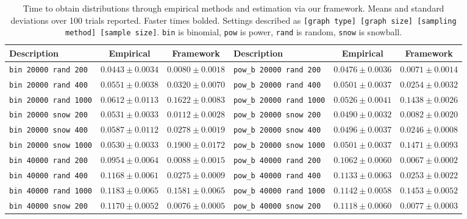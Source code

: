 \begin{table*}
\caption{Time to obtain distributions through empirical methods and estimation via our framework. Means and standard deviations over 100 trials reported. Faster times bolded. Settings described as \texttt{[graph type] [graph size] [sampling method] [sample size]}. \texttt{bin} is binomial, \texttt{pow} is power, \texttt{rand} is random, \texttt{snow} is snowball.}
\label{tab:timings}
\begin{tabular}{lcc|lcc}
\toprule
Description & Empirical & Framework & Description & Empirical & Framework \\
\midrule
\texttt{bin 20000 rand 200} & $0.0443 \pm 0.0034$ & $\mathbf{0.0080 \pm 0.0018}$ & \texttt{pow\_b 20000 rand 200} & $0.0476 \pm 0.0036$ & $\mathbf{0.0071 \pm 0.0014}$ \\
\texttt{bin 20000 rand 400} & $0.0551 \pm 0.0038$ & $\mathbf{0.0320 \pm 0.0070}$ & \texttt{pow\_b 20000 rand 400} & $0.0501 \pm 0.0037$ & $\mathbf{0.0254 \pm 0.0032}$ \\
\texttt{bin 20000 rand 1000} & $\mathbf{0.0612 \pm 0.0113}$ & $0.1622 \pm 0.0083$ & \texttt{pow\_b 20000 rand 1000} & $\mathbf{0.0526 \pm 0.0041}$ & $0.1438 \pm 0.0026$ \\
\texttt{bin 20000 snow 200} & $0.0531 \pm 0.0033$ & $\mathbf{0.0112 \pm 0.0028}$ & \texttt{pow\_b 20000 snow 200} & $0.0490 \pm 0.0032$ & $\mathbf{0.0082 \pm 0.0020}$ \\
\texttt{bin 20000 snow 400} & $0.0587 \pm 0.0112$ & $\mathbf{0.0278 \pm 0.0019}$ & \texttt{pow\_b 20000 snow 400} & $0.0496 \pm 0.0037$ & $\mathbf{0.0246 \pm 0.0008}$ \\
\texttt{bin 20000 snow 1000} & $\mathbf{0.0530 \pm 0.0033}$ & $0.1900 \pm 0.0172$ & \texttt{pow\_b 20000 snow 1000} & $\mathbf{0.0501 \pm 0.0037}$ & $0.1471 \pm 0.0093$ \\
\texttt{bin 40000 rand 200} & $0.0954 \pm 0.0064$ & $\mathbf{0.0088 \pm 0.0015}$ & \texttt{pow\_b 40000 rand 200} & $0.1062 \pm 0.0060$ & $\mathbf{0.0067 \pm 0.0002}$ \\
\texttt{bin 40000 rand 400} & $0.1168 \pm 0.0061$ & $\mathbf{0.0275 \pm 0.0009}$ & \texttt{pow\_b 40000 rand 400} & $0.1133 \pm 0.0063$ & $\mathbf{0.0253 \pm 0.0022}$ \\
\texttt{bin 40000 rand 1000} & $\mathbf{0.1183 \pm 0.0065}$ & $0.1581 \pm 0.0065$ & \texttt{pow\_b 40000 rand 1000} & $\mathbf{0.1142 \pm 0.0058}$ & $0.1453 \pm 0.0052$ \\
\texttt{bin 40000 snow 200} & $0.1170 \pm 0.0052$ & $\mathbf{0.0076 \pm 0.0005}$ & \texttt{pow\_b 40000 snow 200} & $0.1118 \pm 0.0060$ & $\mathbf{0.0077 \pm 0.0003}$ \\

\end{tabular}
\end{table*}
